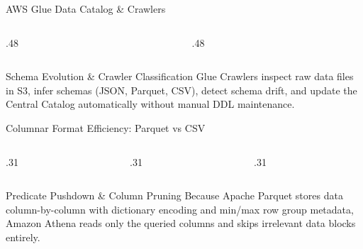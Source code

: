 \documentclass[aspectratio=169,10pt]{beamer}
\begin{document}

\begin{frame}{AWS Glue Data Catalog \& Crawlers}
  \begin{columns}[T,onlytextwidth]
    \begin{column}{.48\textwidth}
    \end{column}
    \begin{column}{.48\textwidth}
    \end{column}
  \end{columns}
  \vspace{0.20cm}
  \begin{ConceptBox}{Schema Evolution \& Crawler Classification}
    Glue Crawlers inspect raw data files in S3, infer schemas (JSON, Parquet, CSV), detect schema drift, and update the Central Catalog automatically without manual DDL maintenance.
  \end{ConceptBox}
\end{frame}

\begin{frame}{Columnar Format Efficiency: Parquet vs CSV}
  \begin{columns}[T,onlytextwidth]
    \begin{column}{.31\textwidth}
    \end{column}
    \begin{column}{.31\textwidth}
    \end{column}
    \begin{column}{.31\textwidth}
    \end{column}
  \end{columns}
  \vspace{0.20cm}
  \begin{DefinitionBox}{Predicate Pushdown \& Column Pruning}
    Because Apache Parquet stores data column-by-column with dictionary encoding and min/max row group metadata, Amazon Athena reads only the queried columns and skips irrelevant data blocks entirely.
  \end{DefinitionBox}
\end{frame}
\end{document}
